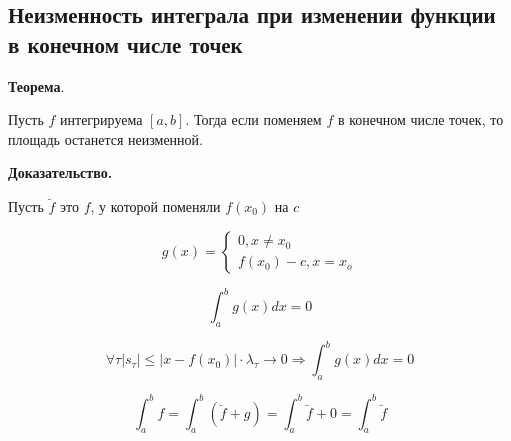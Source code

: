 \documentclass[a4paper]{article}
\begin{document}
\begin{definit}
\subsection*{Неизменность интеграла при изменении функции в конечном числе точек}
\begin{htheorem}\textbf{Теорема}.

Пусть $f$ интегрируема $[a,b]$. Тогда если поменяем $f$ в конечном числе точек, то площадь останется неизменной.
\end{htheorem}


\begin{hproof}\textbf{Доказательство.}

Пусть $\breve{f}$ это $f$, у которой поменяли $f(x_0)$ на $c$

\[
g(x) = \begin{cases} 0, x \neq x_0 \\ f(x_0) - c, x=x_o  \end{cases}
\]

\[
\int_a^b g(x)dx = 0
\]

\[
\forall \tau |s_\tau| \leq |x - f(x_0)| \cdot \lambda_\tau \rightarrow 0 \Rightarrow \int_a^b g(x)dx = 0
\]

\[
\int_a^b f = \int_a^b (\breve{f} + g) = \int_a^b \breve{f} + 0 =  \int_a^b \breve{f}
\]
\end{hproof}
\end{definit}
\end{document}
